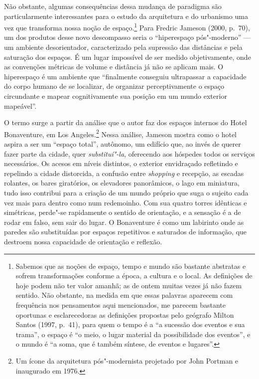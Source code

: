 Não obstante, algumas consequências dessa mudança de paradigma são
particularmente interessantes para o estudo da arquitetura e do
urbanismo uma vez que transforma nossa noção de espaço.\footnote{Sabemos
  que as noções de espaço, tempo e mundo são bastante abstratas e sofrem
  transformações conforme a época, a cultura e o local. As definições de
  hoje podem não ter valor amanhã; as de ontem muitas vezes já não fazem
  sentido. Não obstante, na medida em que essas palavras aparecem com
  frequência nos pensamentos aqui mencionados, me parecem bastante
  oportunas e esclarecedoras as definições propostas pelo geógrafo
  Milton Santos (1997, p.~41), para quem o tempo é a ``a sucessão dos
  eventos e sua trama'', o espaço é ``o meio, o lugar material da
  possibilidade dos eventos'', e o mundo é ``a soma, que é também
  síntese, de eventos e lugares''.} Para Fredric Jameson (2000, p.~70), um dos
produtos desse novo descompasso seria o ``hiperespaço pós"-moderno'' ---
um ambiente desorientador, caracterizado pela supressão das distâncias e
pela saturação dos espaços. É um lugar impossível de ser medido
objetivamente, onde as convenções métricas de volume e distância já não
se aplicam mais. O hiperespaço é um ambiente que ``finalmente conseguiu
ultrapassar a capacidade do corpo humano de se localizar, de organizar
perceptivamente o espaço circundante e mapear cognitivamente sua posição
em um mundo exterior mapeável''.

O termo surge a partir da análise que o autor faz dos espaços internos
do Hotel Bonaventure, em Los Angeles.\footnote{Um ícone da arquitetura
  pós"-modernista projetado por John Portman e inaugurado em 1976.} Nessa
análise, Jameson mostra como o hotel aspira a ser um ``espaço total'',
autônomo, um edifício que, ao invés de querer fazer parte da cidade, quer \emph{substituí"-la}, oferecendo aos hóspedes todos os serviços necessários. Os acesos em níveis distintos, o
exterior envidraçado refletindo e repelindo a cidade distorcida, a
confusão entre \emph{shopping} e recepção, as escadas rolantes, os bares
giratórios, os elevadores panorâmicos, o lago em miniatura, tudo isso
contribui para a criação de um mundo próprio que suga o sujeito cada vez
mais para dentro como num redemoinho. Com sua quatro torres idênticas e simétricas, perde"-se rapidamente o sentido de orientação, e a sensação é a de rodar em falso, sem sair do lugar. O Bonaventure é como um labirinto onde as paredes são substituídas por espaços repetitivos e saturados de informação, que destroem nossa capacidade de orientação e reflexão.

